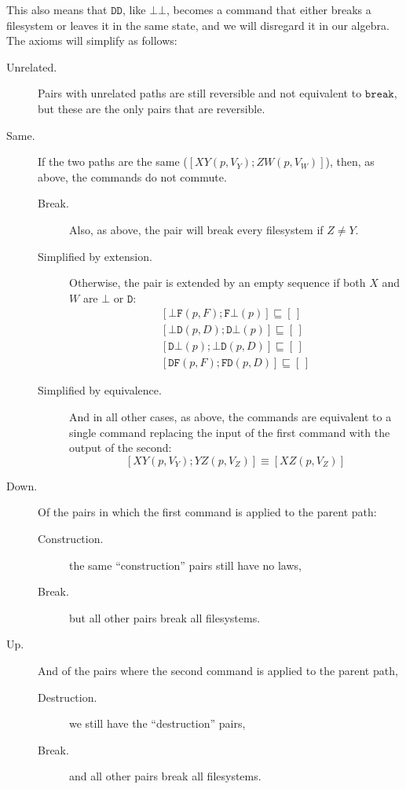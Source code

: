 \documentclass[12pt]{article}
\newcommand{\empt}{\bot}
\newcommand{\cbrk}{\mathtt{break}}
\newcommand{\fscommand}[2]{{#1#2}}
\newcommand{\fsregcommandchar}[1]{\mathtt{#1}}
\newcommand{\fsregcommand}[2]{\fscommand{\fsregcommandchar{#1}}{\fsregcommandchar{#2}}}
\newcommand{\cbb}{\fsregcommand{\empt}{\empt}}
\newcommand{\cbf}{\fsregcommand{\empt}{F}}
\newcommand{\cbd}{\fsregcommand{\empt}{D}}
\newcommand{\cfb}{\fsregcommand{F}{\empt}}
\newcommand{\cfd}{\fsregcommand{F}{D}}
\newcommand{\cdb}{\fsregcommand{D}{\empt}}
\newcommand{\cdf}{\fsregcommand{D}{F}}
\newcommand{\cdd}{\fsregcommand{D}{D}}
\newcommand{\cxy}{\fscommand{X}{Y}}
\newcommand{\cyz}{\fscommand{Y}{Z}}
\newcommand{\cxz}{\fscommand{X}{Z}}
\newcommand{\czw}{\fscommand{Z}{W}}
\newcommand{\eqext}{\sqsubseteq}
\newcommand{\emptyseq}{[\,]}
\begin{document}
This also means that $\cdd$, like $\cbb$, becomes a command that either breaks a filesystem
or leaves it in the same state, and we will disregard it in our algebra.
The axioms will simplify as follows:

\begin{description}
\item[Unrelated.] Pairs with unrelated paths are still reversible and not equivalent to
$\cbrk$, but these are the only pairs that are reversible.
%
\item[Same.] If the two paths are the same ($[\cxy(p,V_Y); \czw(p,V_W)]$), then,
as above, the commands do not commute.
   \begin{description}
   \item[Break.] Also, as above, the pair will break every filesystem if $Z\ne Y$.
   \item[Simplified by extension.] Otherwise, the pair is extended by an empty sequence
   if both $X$ and $W$ are $\fsregcommandchar{\empt}$ or $\fsregcommandchar{D}$:
   \begin{gather*}
            [\cbf(p, F); \cfb(p)] \eqext \emptyseq \\
            [\cbd(p, D); \cdb(p)] \eqext \emptyseq \\
            [\cdb(p); \cbd(p, D)] \eqext \emptyseq \\
            [\cdf(p, F); \cfd(p, D)] \eqext \emptyseq
   \end{gather*}
   \item[Simplified by equivalence.]
   And in all other cases, as above, the commands are equivalent to a single command
   replacing the input of the first command with the output of the second:
   \[ [\cxy(p, V_Y); \cyz(p, V_Z)] \equiv [\cxz(p, V_Z)] \]
   \end{description}
%
\item[Down.]
Of the pairs in which the first command is applied to the parent path:
   \begin{description}
   \item[Construction.] the same ``construction'' pairs still have no laws, 
   \item[Break.] but all other pairs break all filesystems.
   \end{description}
%
\item[Up.]
And of the pairs where the second command
is applied to the parent path,
   \begin{description}
   \item[Destruction.] we still have the ``destruction'' pairs,
   \item[Break.] and all other pairs break all filesystems.
   \end{description}
\end{description}
\end{document}
